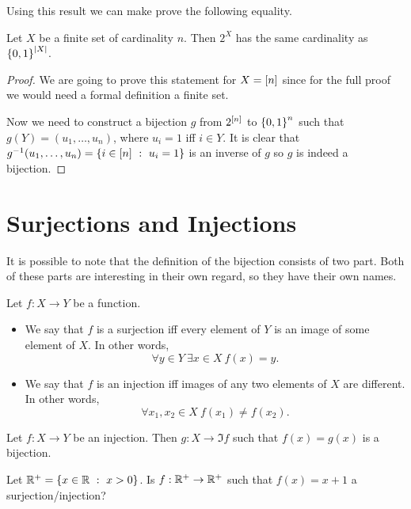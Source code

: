 Using this result we can make prove the following equality.
\begin{corollary}
\label{corollary:power-set-and-set-of-binary-strings}
    Let $X$ be a finite set of cardinality $n$. Then $2^X$ has the same
    cardinality as $\set{0, 1}^{|X|}$.
\end{corollary}
\begin{proof}
  We are going to prove this statement for $X = {[{n}]}$ since for the full
  proof we would need a formal definition a finite set.

  Now we need to construct a bijection $g$ from $2^{{[{n}]}}$ to
  $\set{0, 1}^n$ such that $g(Y) = (u_1, \dots, u_n)$, where $u_i = 1$ iff $i \in Y$.
  It is clear that $g^{-1}(u_1, \dots, u_n) = \set[u_i = 1]{i \in \range{n}}$ is an
  inverse of $g$ so $g$ is indeed a bijection.
\end{proof}

\section{Surjections and Injections}

It is possible to note that the definition of the bijection consists of two part.
Both of these parts are interesting in their own regard, so they have their own
names.
\begin{definition}
    Let $f : X \to Y$ be a function.
    \begin{itemize}
        \item We say that $f$ is a surjection iff every element of $Y$ is an image
            of some element of $X$. In other words,
            \[
                \forall y \in Y~\exists x \in X\ f(x) = y.
            \]
        \item We say that $f$ is an injection iff images of any two elements
            of $X$ are different. In other words,
            \[
                \forall x_1, x_2 \in X\ f(x_1) \neq f(x_2).
            \]
    \end{itemize}
\end{definition}

\begin{remark}
    Let $f : X \to Y$ be an injection. Then $g : X \to \Im f$ such that
    $f(x) = g(x)$ is a bijection.
\end{remark}

\begin{exercise}
    Let $\R^+ = \set[x > 0]{x \in \R}$. Is $f : {\mathbb{R}}^+ \to {\mathbb{R}}^+$ such that
    $f(x) = x + 1$ a surjection/injection?
\end{exercise}

